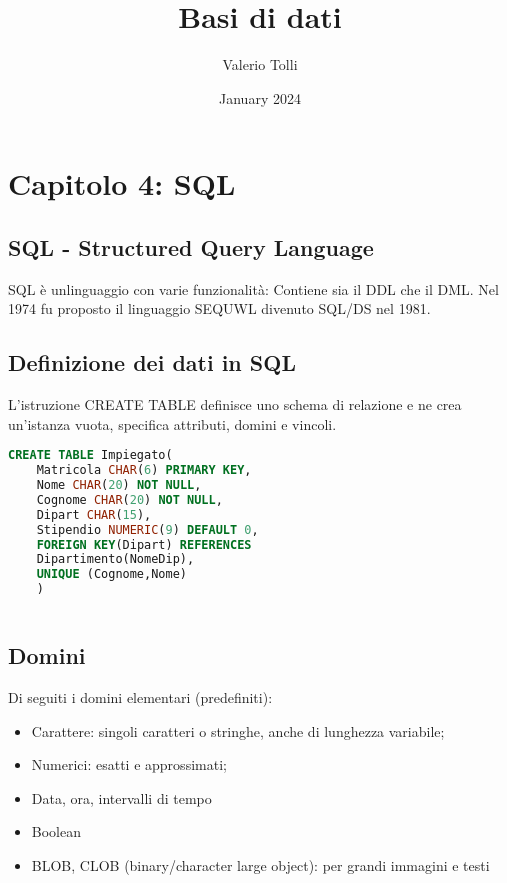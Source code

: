 \documentclass{article}
\title{Basi di dati}
\author{Valerio Tolli}
\date{January 2024}
\begin{document}
\maketitle
\newpage
\tableofcontents
\newpage
\section{Capitolo 4: SQL}

\subsection{SQL - Structured Query Language}
SQL è unlinguaggio con varie funzionalità: Contiene sia il DDL che il DML.
Nel 1974 fu proposto il linguaggio SEQUWL divenuto SQL/DS nel 1981. 
\subsection{Definizione dei dati in SQL}
L'istruzione CREATE TABLE definisce uno schema di relazione e ne crea un'istanza vuota, specifica attributi, domini e vincoli.
\begin{center}
    
   \begin{lstlisting}[language=SQL]
    CREATE TABLE Impiegato(
    Matricola CHAR(6) PRIMARY KEY,
    Nome CHAR(20) NOT NULL,
    Cognome CHAR(20) NOT NULL,
    Dipart CHAR(15),
    Stipendio NUMERIC(9) DEFAULT 0,
    FOREIGN KEY(Dipart) REFERENCES
    Dipartimento(NomeDip),
    UNIQUE (Cognome,Nome)
    ) 
        
    \end{lstlisting} 
\end{center}

\subsection{Domini}
Di seguiti i domini elementari (predefiniti):
\begin{itemize}
    \item Carattere: singoli caratteri o stringhe, anche di lunghezza variabile;
    \item Numerici: esatti e approssimati;
    \item Data, ora, intervalli di tempo
    \item Boolean
    \item BLOB, CLOB (binary/character large object): per grandi immagini e testi
    
\end{itemize}
\end{document}
